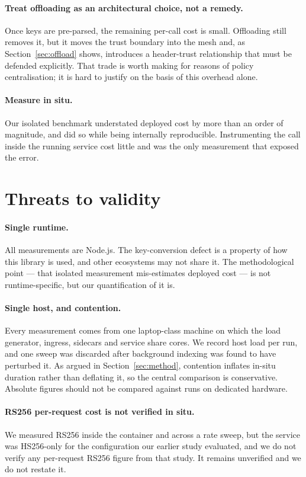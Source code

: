 \documentclass[pdflatex,sn-basic,twocolumn]{sn-jnl}
\begin{document}
\paragraph{Treat offloading as an architectural choice, not a remedy.} Once keys
are pre-parsed, the remaining per-call cost is small. Offloading still removes
it, but it moves the trust boundary into the mesh and, as
Section~\ref{sec:offload} shows, introduces a header-trust relationship that must
be defended explicitly. That trade is worth making for reasons of policy
centralisation; it is hard to justify on the basis of this overhead alone.

\paragraph{Measure in situ.} Our isolated benchmark understated deployed cost by
more than an order of magnitude, and did so while being internally reproducible.
Instrumenting the call inside the running service cost little and was the only
measurement that exposed the error.

\section{Threats to validity}\label{sec:threats}

\paragraph{Single runtime.} All measurements are Node.js. The key-conversion
defect is a property of how this library is used, and other ecosystems may not
share it. The methodological point --- that isolated measurement mis-estimates
deployed cost --- is not runtime-specific, but our quantification of it is.

\paragraph{Single host, and contention.} Every measurement comes from one
laptop-class machine on which the load generator, ingress, sidecars and service
share cores. We record host load per run, and one sweep was discarded after
background indexing was found to have perturbed it. As argued in
Section~\ref{sec:method}, contention inflates in-situ duration rather than
deflating it, so the central comparison is conservative. Absolute figures should
not be compared against runs on dedicated hardware.

\paragraph{RS256 per-request cost is not verified in situ.} We measured RS256
inside the container and across a rate sweep, but the service was HS256-only for
the configuration our earlier study evaluated, and we do not verify any
per-request RS256 figure from that study. It remains unverified and we do not
restate it.
\end{document}
